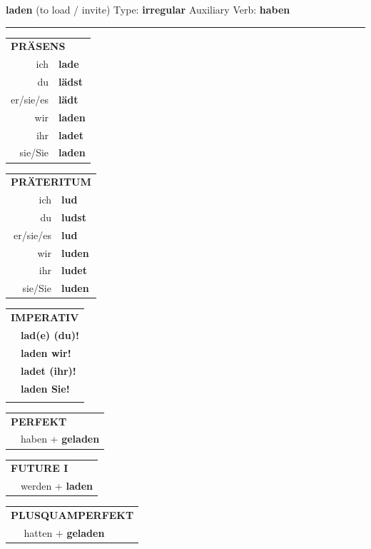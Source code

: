 \documentclass[10pt,a4paper]{revtex4-2}
\begin{document}
\begin{verbbox-acc}
    {\Large \bf laden} (to load / invite) \hfill Type: \textbf{irregular} \hfill Auxiliary Verb: \textbf{haben} 
    
     \vspace{5pt}

    \hrule
    
    \vspace{5pt}

  \begin{tabular}{rl}
     \multicolumn{2}{l}{\textbf{PRÄSENS} }\\
    ich & \textbf{lade}\\
    du & \textbf{lädst}\\
    er/sie/es & \textbf{lädt}\\
    wir & \textbf{laden}\\
    ihr & \textbf{ladet}\\
    sie/Sie & \textbf{laden}\\
  \end{tabular}
  \hfill
  \begin{tabular}{rl}
    \multicolumn{2}{l}{\textbf{PRÄTERITUM} }\\
    ich & \textbf{lud}\\
    du & \textbf{ludst}\\
    er/sie/es & \textbf{lud}\\
    wir & \textbf{luden}\\
    ihr & \textbf{ludet}\\
    sie/Sie & \textbf{luden}\\
  \end{tabular}
  \hfill
  \begin{tabular}{rl}
     \multicolumn{2}{l}{\textbf{IMPERATIV} }\\
   & \textbf{lad(e) (du)!}\\
   & \textbf{laden wir!}\\
   & \textbf{ladet (ihr)!}\\
   & \textbf{laden Sie!}\\
   & \vspace{10pt}
  \end{tabular}

 \vspace{10pt}

 \begin{tabular}{rl}
     \multicolumn{2}{l}{\textbf{PERFEKT}}\\
   & haben + \textbf{geladen}\\
  \end{tabular}
\hfill
\begin{tabular}{rl}
    \multicolumn{2}{l}{\textbf{FUTURE I}}\\
   & werden + \textbf{laden}\\
  \end{tabular}
\hfill
\begin{tabular}{rl}
    \multicolumn{2}{l}{\textbf{PLUSQUAMPERFEKT}}\\
   & hatten + \textbf{geladen}\\
  \end{tabular}


\end{verbbox-acc}
\end{document}
